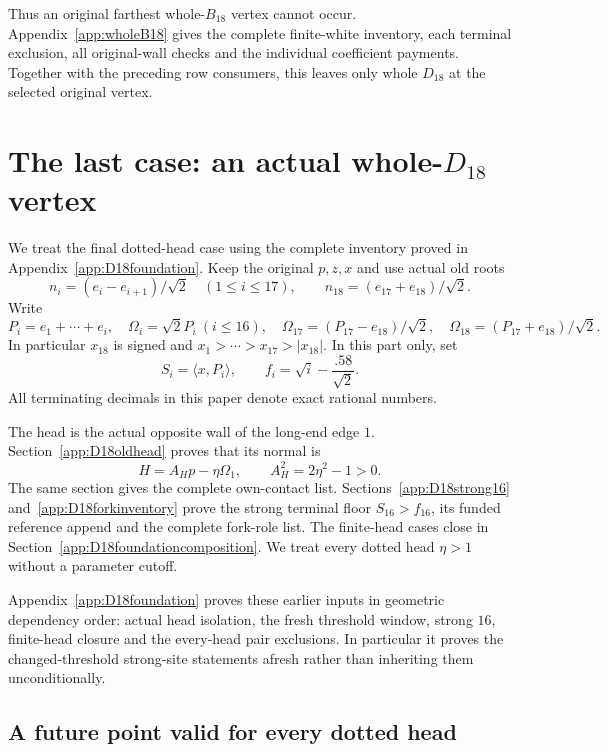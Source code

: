 \documentclass[11pt]{article}
\theoremstyle{definition}
\theoremstyle{remark}
\newcommand{\ip}[2]{\langle #1,#2\rangle}
\begin{document}
Thus an original farthest whole-\(B_{18}\) vertex cannot occur.
Appendix~\ref{app:wholeB18} gives the complete finite-white inventory,
each terminal exclusion, all original-wall checks and the individual
coefficient payments. Together with the preceding row consumers,
this leaves only whole \(D_{18}\) at the selected original vertex.

\section[The last case: an actual whole-D18 vertex]{The last case: an actual whole-\(D_{18}\) vertex}
\label{sec:d18-setup}

We treat the final dotted-head case using the complete inventory
proved in Appendix~\ref{app:D18foundation}.
Keep the original \(p,z,x\) and use actual old roots
\[
 n_i=(e_i-e_{i+1})/\sqrt2\quad(1\leq i\leq17),\qquad
 n_{18}=(e_{17}+e_{18})/\sqrt2.
\]
Write
\[
 P_i=e_1+\cdots+e_i,\quad
 \Omega_i=\sqrt2P_i\ (i\leq16),\quad
 \Omega_{17}=(P_{17}-e_{18})/\sqrt2,\quad
 \Omega_{18}=(P_{17}+e_{18})/\sqrt2.
\]
In particular \(x_{18}\) is signed and
\(x_1>\cdots>x_{17}>|x_{18}|\). In this part only, set
\begin{equation}
\label{eq:d18floors}
 S_i=\ip{x}{P_i},\qquad f_i=\sqrt i-\frac{.58}{\sqrt2}.
\end{equation}
All terminating decimals in this paper denote exact rational numbers.

The head is the actual opposite wall of the long-end edge \(1\).
Section~\ref{app:D18oldhead} proves that its normal is
\[
 H=A_Hp-\eta\Omega_1,\qquad A_H^2=2\eta^2-1>0.
\]
The same section gives the complete own-contact list.
Sections~\ref{app:D18strong16} and~\ref{app:D18forkinventory} prove
the strong terminal floor \(S_{16}>f_{16}\), its funded reference
append and the complete fork-role list. The finite-head cases close
in Section~\ref{app:D18foundationcomposition}.
We treat every dotted head \(\eta>1\) without a parameter cutoff.

Appendix~\ref{app:D18foundation} proves these earlier inputs in
geometric dependency order: actual head isolation, the fresh threshold
window, strong \(16\), finite-head closure and the every-head pair
exclusions. In particular it proves the changed-threshold strong-site
statements afresh rather than inheriting them unconditionally.

\subsection{A future point valid for every dotted head}
\end{document}
